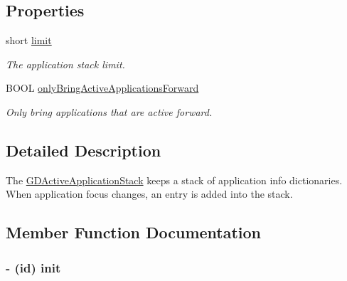 \subsection*{Properties}
\begin{DoxyCompactItemize}
\item 
\hypertarget{interface_g_d_active_application_stack_a1e2c66f799b40713777d4e0ce37821d4}{
short \hyperlink{interface_g_d_active_application_stack_a1e2c66f799b40713777d4e0ce37821d4}{limit}}
\label{interface_g_d_active_application_stack_a1e2c66f799b40713777d4e0ce37821d4}

\begin{DoxyCompactList}\small\item\em The application stack limit. \item\end{DoxyCompactList}\item 
BOOL \hyperlink{interface_g_d_active_application_stack_a5714844d3e17a156cca14b1f383b3dbe}{onlyBringActiveApplicationsForward}
\begin{DoxyCompactList}\small\item\em Only bring applications that are active forward. \item\end{DoxyCompactList}\end{DoxyCompactItemize}


\subsection{Detailed Description}
The \hyperlink{interface_g_d_active_application_stack}{GDActiveApplicationStack} keeps a stack of application info dictionaries. When application focus changes, an entry is added into the stack. 

\subsection{Member Function Documentation}
\hypertarget{interface_g_d_active_application_stack_a691da7b73f204f9431b96ffa53783bc6}{
\subsubsection[{init}]{\setlength{\rightskip}{0pt plus 5cm}-\/ (id) init }}
\label{interface_g_d_active_application_stack_a691da7b73f204f9431b96ffa53783bc6}


